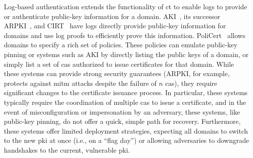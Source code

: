 Log-based authentication extends the functionality of \ac{ct} to enable logs to
provide or authenticate public-key information for a domain.
AKI~\cite{kim2013accountable}, its successor ARPKI~\cite{basin2014arpki}, and
CIRT~\cite{ryan2014enhanced} have logs directly provide public-key information
for domains and use log proofs to efficiently prove this information.
PoliCert~\cite{szalachowski2014policert} allows domains to specify a rich set of
policies. These policies can emulate public-key pinning or systems such as AKI
by directly listing the public keys of a domain, or simply list a set of
\acp{ca} authorized to issue certificates for that domain. While these systems
can provide strong security guarantees (ARPKI, for example, protects against
\ac{mitm} attacks despite the failure of $n$ \acp{ca}), they require significant
changes to the certificate issuance process. In particular, these systems
typically require the coordination of multiple \acp{ca} to issue a certificate, and in
the event of misconfiguration or impersonation by an adversary, these systems,
like public-key pinning, do not offer a quick, simple path for recovery.
Furthermore, these systems offer limited deployment strategies, expecting all
domains to switch to the new \ac{pki} at once (i.e., on a ``flag day'') or allowing adversaries to
downgrade handshakes to the current, vulnerable \ac{pki}.






